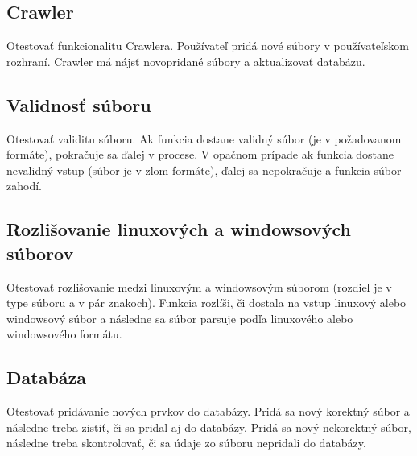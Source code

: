 \documentclass[12pt,a4paper]{article}
\begin{document}
\subsection{Crawler}
Otestovať funkcionalitu Crawlera. Používateľ pridá nové súbory v používateľskom rozhraní. Crawler má nájsť novopridané súbory a aktualizovať databázu. 

\subsection{Validnosť súboru}
Otestovať validitu súboru. Ak funkcia dostane validný súbor (je v požado\-vanom formáte), pokračuje sa ďalej v procese. V opačnom prípade ak funkcia dostane nevalidný vstup (súbor je v zlom formáte), ďalej sa nepokračuje a funkcia súbor zahodí.

\subsection{Rozlišovanie linuxových a windowsových súborov}
Otestovať rozlišovanie medzi linuxovým a windowsovým súborom (rozdiel je v type súboru a v pár znakoch). Funkcia rozlíši, či dostala na vstup linu\-xový alebo windowsový súbor a následne sa súbor parsuje podľa linuxového alebo windowsového formátu.  

\subsection{Databáza}
Otestovať pridávanie nových prvkov do databázy. Pridá sa nový korektný súbor a následne treba zistiť, či sa pridal aj do databázy. Pridá sa nový nekorektný súbor, následne treba skontrolovať, či sa údaje zo súboru nepridali do databázy.
\end{document}
